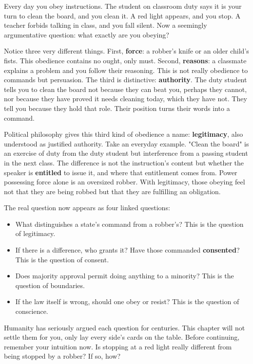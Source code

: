 Every day you obey instructions. The student on classroom duty says it is your turn to clean the board, and you clean it. A red light appears, and you stop. A teacher forbids talking in class, and you fall silent. Now a seemingly argumentative question: what exactly are you obeying?

Notice three very different things. First, \textbf{force}: a robber's knife or an older child's fists. This obedience contains no ought, only must. Second, \textbf{reasons}: a classmate explains a problem and you follow their reasoning. This is not really obedience to commands but persuasion. The third is distinctive: \textbf{authority}. The duty student tells you to clean the board not because they can beat you, perhaps they cannot, nor because they have proved it needs cleaning today, which they have not. They tell you because they hold that role. Their position turns their words into a command.

Political philosophy gives this third kind of obedience a name: \textbf{legitimacy}, also understood as justified authority. Take an everyday example. "Clean the board" is an exercise of duty from the duty student but interference from a passing student in the next class. The difference is not the instruction's content but whether the speaker is \textbf{entitled} to issue it, and where that entitlement comes from. Power possessing force alone is an oversized robber. With legitimacy, those obeying feel not that they are being robbed but that they are fulfilling an obligation.

The real question now appears as four linked questions:

\begin{itemize}
\item What distinguishes a state's command from a robber's? This is the question of legitimacy.
\item If there is a difference, who grants it? Have those commanded \textbf{consented}? This is the question of consent.
\item Does majority approval permit doing anything to a minority? This is the question of boundaries.
\item If the law itself is wrong, should one obey or resist? This is the question of conscience.
\end{itemize}
Humanity has seriously argued each question for centuries. This chapter will not settle them for you, only lay every side's cards on the table. Before continuing, remember your intuition now. Is stopping at a red light really different from being stopped by a robber? If so, how?

